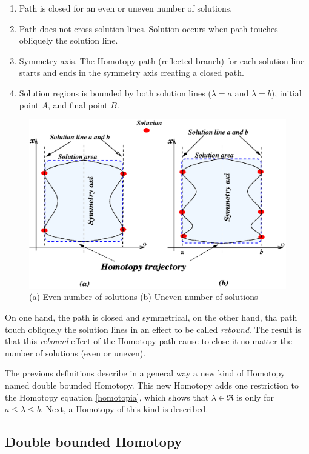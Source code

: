 \documentclass[conference,letterpaper,onecolumn]{IEEEtran}
\begin{document}
\begin{enumerate}
\item  Path is closed for an even or uneven number of solutions.
\item  Path does not cross solution lines. Solution occurs when path touches obliquely the solution line.
\item  Symmetry axis. The Homotopy path (reflected branch) for each solution line starts and ends in the symmetry axis creating a closed path.
\item  Solution regions is bounded by both solution lines ($\lambda=a$ and $\lambda=b$), initial point $A$, and final point $B$.
\end{enumerate}

\begin{figure}[hbtp]
\centering
\includegraphics[scale=0.95]{figs/chap3/figs/ddb.eps}
\caption{(a) Even number of solutions (b) Uneven number of solutions}
\label{Z1}
\end{figure}

On one hand, the path is closed and symmetrical, on the other hand, tha path touch obliquely the solution lines in an effect to be called {\it rebound}. The result is that this {\it rebound} effect of the Homotopy path cause to close it no matter the number of solutions (even or uneven).

The previous definitions describe in a general way a new kind of Homotopy named double bounded Homotopy. This new Homotopy adds one restriction to the Homotopy equation \ref{homotopia}, which shows that $\lambda\in \Re $ is only for $a \le\lambda\le b$. Next, a Homotopy of this kind is described.

\subsection{Double bounded Homotopy}
\end{document}
